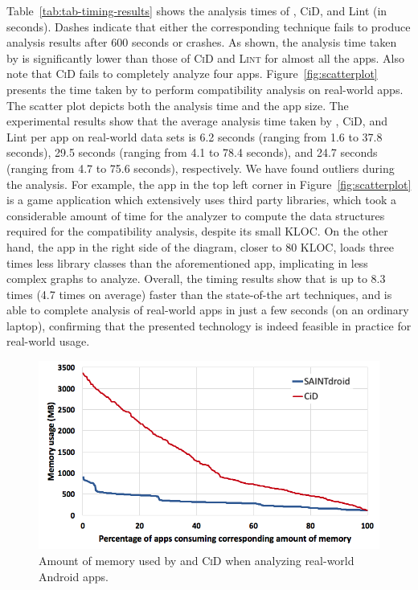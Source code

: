 Table~\ref{tab:tab-timing-results} shows the analysis
times of \@approach, {\sc CiD}, and {\sc Lint} (in
seconds).  Dashes indicate that either the
corresponding technique fails to produce analysis
results after 600 seconds or crashes.
As shown, the analysis time taken by \@approach is
significantly lower than those of \textsc{CiD} and
\textsc{Lint} for almost all the apps. Also note that
\textsc{CiD} fails to completely analyze four apps.
Figure~\ref{fig:scatterplot} presents the time taken by
\@approach to perform compatibility analysis on
real-world apps.  The scatter plot depicts both the
analysis time and the app size.  The experimental
results show that the average analysis time taken by
\@approach, {\sc CiD}, and {\sc Lint} per app on
real-world data sets is 6.2 seconds (ranging from 1.6
to 37.8 seconds), 29.5 seconds (ranging from 4.1 to
78.4 seconds), and 24.7 seconds (ranging from 4.7 to
75.6 seconds), respectively. We have found outliers
during the analysis. For example, the app in the top
left corner in Figure~\ref{fig:scatterplot} is a game
application which extensively uses third party
libraries, which took a considerable amount of time for
the analyzer to compute the data structures required
for the compatibility analysis, despite its small KLOC.
On the other hand, the app in the right side of the
diagram, closer to 80 KLOC, loads three times less
library classes than the aforementioned app,
implicating in less complex graphs to analyze.
Overall, the timing results show that \@approach  is up
to 8.3 times (4.7 times on average) faster than the
state-of-the art techniques, and is able to complete
analysis of real-world apps in just a few seconds (on
an ordinary laptop), confirming that the presented
technology is indeed feasible in practice for
real-world usage.


\begin{figure}[b!]
	\centering
	    \vspace{-0.4cm}
	\includegraphics[width=0.77\linewidth]{images/memory_gd.png}
	\caption{Amount of memory used by \@approach and \textsc{CiD} when analyzing real-world Android apps.}
	\label{fig:memory_gd}
\end{figure}

